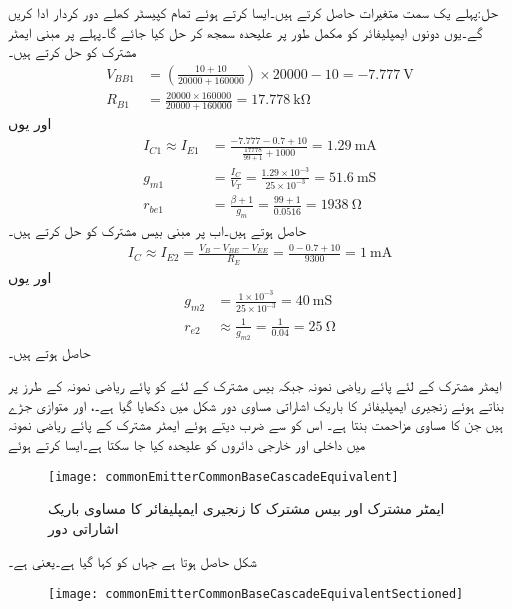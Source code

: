 حل:پہلے یک سمت متغیرات حاصل کرتے ہیں۔ایسا کرتے ہوئے تمام کپیسٹر کھلے دور کردار ادا کریں گے۔یوں دونوں ایمپلیفائر کو مکمل طور پر علیحدہ سمجھ کر حل کیا جائے گا۔پہلے  پر مبنی  ایمٹر مشترک کو حل کرتے ہیں۔
\begin{align*}
V_{BB1}&=\left(\frac{10+10}{20000+160000}\right) \times 20000-10=\SI{-7.777}{\volt}\\
R_{B1}&=\frac{20000 \times 160000}{20000+160000}=\SI{17.778}{\kilo \ohm}
\end{align*} 
اور یوں
\begin{align*}
I_{C1} \approx I_{E1}&=\frac{-7.777-0.7+10}{\frac{17778}{99+1}+1000}=\SI{1.29}{\milli \ampere}\\
g_{m1}&=\frac{I_C}{V_T}=\frac{1.29 \times 10^{-3}}{25 \times 10^{-3}}=\SI{51.6}{\milli \siemens}\\
r_{be1}&=\frac{\beta+1}{g_m}=\frac{99+1}{0.0516}=\SI{1938}{\ohm}
\end{align*}
حاصل ہوتے ہیں۔اب  پر مبنی بیس مشترک کو حل کرتے ہیں۔
\begin{align*}
I_{C} \approx I_{E2}=\frac{V_B-V_{BE}-V_{EE}}{R_E}=\frac{0-0.7+10}{9300}=\SI{1}{\milli \ampere}
\end{align*}
اور یوں
\begin{align*}
g_{m2}&=\frac{1 \times 10^{-3}}{25 \times 10^{-3}}=\SI{40}{\milli \siemens}\\
r_{e2}&\approx \frac{1}{g_{m2}}=\frac{1}{0.04}=\SI{25}{\ohm}
\end{align*}
حاصل ہوتے ہیں۔

ایمٹر مشترک کے لئے پائے ریاضی نمونہ  جبکہ بیس مشترک کے لئے  کو پائے ریاضی نمونہ  کے طرز پر بناتے ہوئے زنجیری ایمپلیفائر کا باریک اشاراتی مساوی دور شکل  میں دکھایا گیا ہے۔،  اور  متوازی جڑے ہیں جن کا مساوی مزاحمت   بنتا ہے۔ اس کو  سے ضرب دیتے ہوئے ایمٹر مشترک کے پائے ریاضی نمونہ  میں داخلی اور خارجی دائروں کو علیحدہ کیا جا سکتا ہے۔ایسا کرتے ہوئے
\begin{figure}
\centering
\texttt{[image: commonEmitterCommonBaseCascadeEquivalent]}
\caption{ایمٹر مشترک اور بیس مشترک کا زنجیری ایمپلیفائر کا مساوی باریک اشاراتی دور}
\label{شکل_ٹرانزسٹر_مخارج_مشترک_قابو_مشترک_زنجیر_مساوی}
\end{figure}
شکل  حاصل ہوتا ہے جہاں  کو  کہا گیا ہے۔یعنی  ہے۔
\begin{figure}
\centering
\texttt{[image: commonEmitterCommonBaseCascadeEquivalentSectioned]}
\caption{}
\label{شکل_ٹرانزسٹر_مخارج_مشترک_قابو_مشترک_زنجیر_مساوی_الف}
\end{figure}

